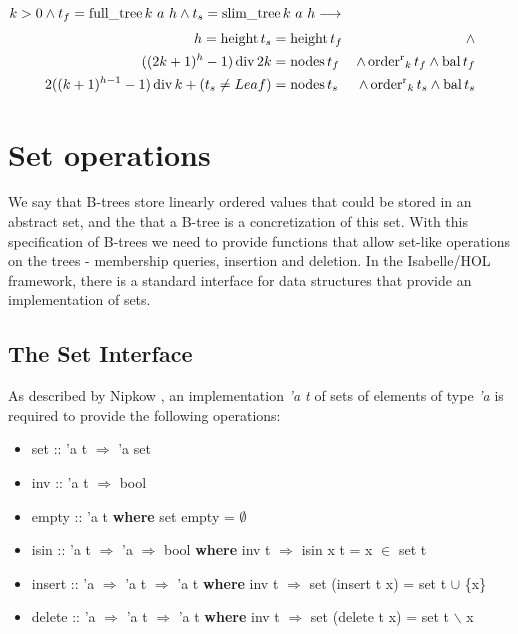 \begin{theorem}
    $k > 0 \wedge t_f = \operatorname{full\_tree} k\ a\ h \wedge t_s = \operatorname{slim\_tree} k\ a\ h \longrightarrow$
    \begin{align*}
    h = \operatorname{height} t_s &= \operatorname{height} t_f &\wedge \\
        ((2k+1)^h - 1) \operatorname{div} 2k &= \operatorname{nodes} t_f &\wedge \operatorname{order^r}_k t_f \wedge \operatorname{bal} t_f \\ 
        2((k+1)^{h-1} - 1) \operatorname{div} k + (t_s \neq Leaf) &= \operatorname{nodes} t_s &\wedge \operatorname{order^r}_k t_s \wedge \operatorname{bal} t_s
    \end{align*}
\end{theorem}


\section{Set operations}

We say that B-trees store linearly ordered values
that could be stored in an abstract set,
and the that a B-tree is a concretization
of this set.
With this specification of B-trees we need to provide functions that allow
set-like operations on the trees -
membership queries, insertion and deletion.
In the Isabelle/HOL framework, there is a standard interface
for data structures that provide an implementation of sets.

\subsection{The Set Interface}

As described by Nipkow \parencite{DBLP:conf/itp/Nipkow16},
an implementation \textit{'a t} of sets of elements of type \textit{'a} is required to provide the following
operations:

\begin{itemize}
    \itshape
    \item set :: 'a t $\Rightarrow$ 'a set
    \item inv :: 'a t $\Rightarrow$ bool
    \item empty :: 'a t \textup{\textbf{where}} set empty = $\emptyset$
    \item isin :: 'a t $\Rightarrow$ 'a $\Rightarrow$ bool \textup{\textbf{where}} inv t $\Longrightarrow$ isin x t = x $\in$ set t
    \item insert :: 'a $\Rightarrow$ 'a t $\Rightarrow$ 'a t \textup{\textbf{where}} inv t $\Longrightarrow$ set (insert t x) = set t $\cup$ \{x\}
    \item delete :: 'a $\Rightarrow$ 'a t $\Rightarrow$ 'a t \textup{\textbf{where}} inv t $\Longrightarrow$ set (delete t x) = set t $\backslash$ {x}
\end{itemize}

